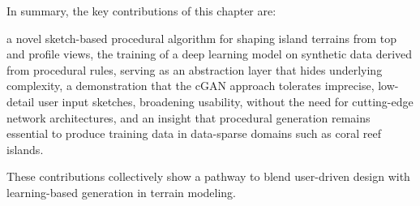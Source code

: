 In summary, the key contributions of this chapter are:
\begin{Itemize}
    \Item{} a novel sketch-based procedural algorithm for shaping island terrains from top and profile views,
    \Item{} the training of a deep learning model on synthetic data derived from procedural rules, serving as an abstraction layer that hides underlying complexity,
    \Item{} a demonstration that the cGAN approach tolerates imprecise, low-detail user input sketches, broadening usability, without the need for cutting-edge network architectures, 
    \Item{} and an insight that procedural generation remains essential to produce training data in data-sparse domains such as coral reef islands.
\end{Itemize}
These contributions collectively show a pathway to blend user-driven design with learning-based generation in terrain modeling.















